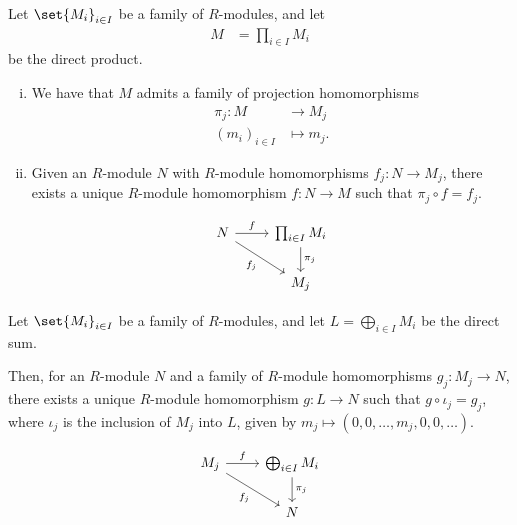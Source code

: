 \documentclass[10pt]{mypackage}
\begin{document}
\begin{theorem}
  Let $\set{M_i}_{i\in I}$ be a family of $R$-modules, and let
  \begin{align*}
    M &= \prod_{i\in I}M_i
  \end{align*}
  be the direct product.
  \begin{enumerate}[(i)]
    \item We have that $M$ admits a family of projection homomorphisms
      \begin{align*}
        \pi_j\colon M&\rightarrow M_j\\
        \left( m_i \right)_{i\in I} &\mapsto m_j.
      \end{align*}
    \item Given an $R$-module $N$ with $R$-module homomorphisms $f_j\colon N\rightarrow M_j$, there exists a unique $R$-module homomorphism $f\colon N\rightarrow M$ such that $\pi_j\circ f = f_j$.
      \begin{center}
\[\begin{tikzcd}
	N & {\prod_{i\in I}M_i} \\
	& {M_j}
	\arrow["f", from=1-1, to=1-2]
	\arrow["{f_j}"', from=1-1, to=2-2]
	\arrow["{\pi_j}", from=1-2, to=2-2]
\end{tikzcd}\]
      \end{center}
  \end{enumerate}
\end{theorem}
\begin{theorem}
  Let $\set{M_i}_{i\in I}$ be a family of $R$-modules, and let $L = \bigoplus_{i\in I}M_i$ be the direct sum.%

  Then, for an $R$-module $N$ and a family of $R$-module homomorphisms $g_j\colon M_j\rightarrow N$, there exists a unique $R$-module homomorphism $g\colon L\rightarrow N$ such that $g\circ \iota_j = g_j$, where $\iota_j$ is the inclusion of $M_j$ into $L$, given by $m_j\mapsto \left( 0,0,\dots,m_j,0,0,\dots \right)$.
  \begin{center}
\[\begin{tikzcd}
	{M_j} & {\bigoplus_{i\in I}M_i} \\
	& N
	\arrow["f", from=1-1, to=1-2]
	\arrow["{f_j}"', from=1-1, to=2-2]
	\arrow["{\pi_j}", from=1-2, to=2-2]
\end{tikzcd}\]
  \end{center}
\end{theorem}
\end{document}
